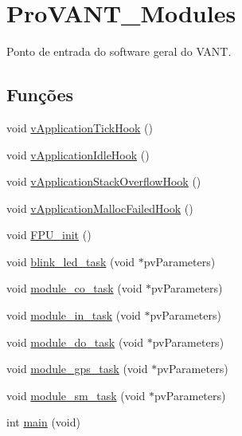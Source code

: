 \hypertarget{group__ProVANT__Modules}{\section{Pro\-V\-A\-N\-T\-\_\-\-Modules}
\label{group__ProVANT__Modules}
}


Ponto de entrada do software geral do V\-A\-N\-T.  


\subsection*{Funções}
\begin{DoxyCompactItemize}
\item 
void \hyperlink{group__ProVANT__Modules_ga2850b09d1bb227364b5ff6de6f85f740}{v\-Application\-Tick\-Hook} ()
\item 
void \hyperlink{group__ProVANT__Modules_ga11cbdd335da884dec1204e230554bfd9}{v\-Application\-Idle\-Hook} ()
\item 
void \hyperlink{group__ProVANT__Modules_ga8f5b98d87cfd1379b8d6573159bcbdd3}{v\-Application\-Stack\-Overflow\-Hook} ()
\item 
void \hyperlink{group__ProVANT__Modules_ga73f6aa45470ada02a5d6f3a522d8f13c}{v\-Application\-Malloc\-Failed\-Hook} ()
\item 
void \hyperlink{group__ProVANT__Modules_ga73e2a1fcfc7e7f2bb22937e543997019}{F\-P\-U\-\_\-init} ()
\item 
void \hyperlink{group__ProVANT__Modules_ga39e7a5088757fe328c0162fe25d907bf}{blink\-\_\-led\-\_\-task} (void $\ast$pv\-Parameters)
\item 
void \hyperlink{group__ProVANT__Modules_gab0c5d271dba436247302632e599731ba}{module\-\_\-co\-\_\-task} (void $\ast$pv\-Parameters)
\item 
void \hyperlink{group__ProVANT__Modules_ga7de15cbee9a0ca9eafb3eb25f5e3d691}{module\-\_\-in\-\_\-task} (void $\ast$pv\-Parameters)
\item 
void \hyperlink{group__ProVANT__Modules_ga466679da7a6953ce332271681ce397c7}{module\-\_\-do\-\_\-task} (void $\ast$pv\-Parameters)
\item 
void \hyperlink{group__ProVANT__Modules_gac55e5b60dffafe957dddc7aa452bfa9d}{module\-\_\-gps\-\_\-task} (void $\ast$pv\-Parameters)
\item 
void \hyperlink{group__ProVANT__Modules_gaad8bcaa035ca56eddd3ccbf522298711}{module\-\_\-sm\-\_\-task} (void $\ast$pv\-Parameters)
\item 
int \hyperlink{group__ProVANT__Modules_ga840291bc02cba5474a4cb46a9b9566fe}{main} (void)
\end{DoxyCompactItemize}


